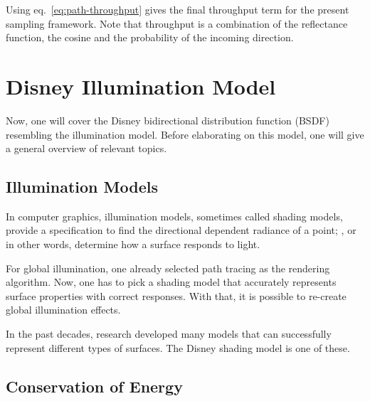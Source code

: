 Using eq.~\ref{eq:path-throughput} gives the final throughput term for the present sampling framework.
Note that throughput is a combination of the reflectance function, the cosine and the probability of the incoming direction.



\section{Disney Illumination Model} \label{sec:disney-illumination-model}

Now, one will cover the Disney bidirectional distribution function (BSDF) resembling the illumination model.
Before elaborating on this model, one will give a general overview of relevant topics.

\subsection*{Illumination Models}

In computer graphics, illumination models, sometimes called shading models, provide a specification to find the directional dependent radiance of a point; \cite{duin_beleuchtungsalgorithmen_1993}, or in other words, determine how a surface responds to light.

For global illumination, one already selected path tracing as the rendering algorithm.
Now, one has to pick a shading model that accurately represents surface properties with correct responses.
With that, it is possible to re-create global illumination effects.

In the past decades, research developed many models that can successfully represent different types of surfaces.
The Disney shading model is one of these.

\subsection*{Conservation of Energy}

